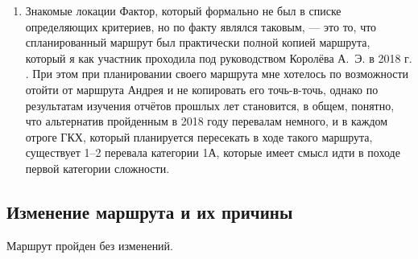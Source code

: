 \begin{enumerate}
	\item Знакомые локации 
	Фактор, который формально не был в списке определяющих критериев, но по факту являлся таковым, — это то, что спланированный маршрут был практически полной копией маршрута, который я как участник проходила под руководством Королёва А.~Э. в 2018 г. \cite{Korolyov2018}. При этом при планировании своего маршрута мне хотелось по возможности отойти от маршрута Андрея и не копировать его точь-в-точь, однако по результатам изучения отчётов прошлых лет становится, в общем, понятно, что альтернатив пройденным в 2018 году перевалам немного, и в каждом отроге ГКХ, который планируется пересекать в ходе такого маршрута, существует 1–2 перевала категории 1А, которые имеет смысл идти в походе первой категории сложности.
\end{enumerate} 

\subsection{Изменение маршрута и их причины}
Маршрут пройден без изменений.
